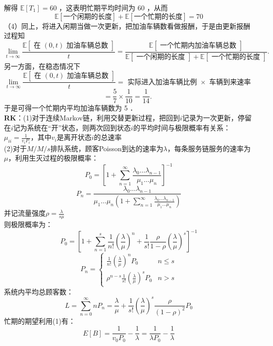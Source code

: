 \documentclass[UTF8]{ctexart}
\begin{document}
解得 $\mathbb{E} [T_1]=60$ ，这表明忙期平均时间为 60 ，从而
$$\mathbb{E}[ \text{一个闲期的长度} ]+\mathbb{E}[ \text{一个忙期的长度} ]=70$$
（4）同上，将进入闲期当做一次更新，把加油车辆数看做报酬，于是由更新报酬过程知\\
$$
\lim _{t \rightarrow \infty} \frac{\mathbb{E}[\text { 在 }(0, t) \text { 加油车辆总数 }]}{t}=\frac{\mathbb{E}[\text { 一个忙期内加油车辆总数 }]}{\mathbb{E}[\text { 一个闲期的长度 }]+\mathbb{E}[\text { 一个忙期的长度 }]} .
$$
另一方面，在稳态情况下\\
\[
\lim _{t \rightarrow \infty} \frac{\mathbb{E}[\text { 在 }(0, t) \text { 加油车辆总数 }]}{t}=\text { 实际进入加油车辆比例 } \times \text { 车辆到来速率 }
\]
\[
=\frac{5}{7} \times \frac{1}{10}=\frac{1}{14} \text {. }
\]
于是可得一个忙期内平均加油车辆数为 5 ．\\
\textbf{RK}：(1)对于连续Markov链，利用交替更新过程，把回到$i$记录为一次更新，停留在$i$记为系统在“开”状态，则两次回到状态$i$的平均时间与极限概率有关系：$\mu_{ii}=\frac{1}{v_i P_i}$，其中$v_i$是离开状态$i$的总速率\\
(2)对于$M/ M/ s$排队系统，顾客Poisson到达的速率为$\lambda$，每条服务链服务的速率为$\mu$，利用生灭过程的极限概率：\\
\[
P_0=\left[1+\sum\limits_{n=1}^{\infty} \frac{\lambda_0 \dots \lambda_{n-1}}{\mu_1 \dots \mu_n} \right] ^{-1}
\]
\[
P_n=\frac{\lambda_0 \dots \lambda_{n-1}}{\mu_1 \dots \mu_n\left(1+\sum\limits_{n=1}^{\infty} \frac{\lambda_0 \dots \lambda_{n-1}}{\mu_1 \dots \mu_n} \right) }
\]
并记流量强度$\rho=\frac{\lambda}{s\mu}$\\
则极限概率为：
\[
P_0=\left[1+\sum\limits_{n=1}^{s} \frac{1}{n!} \left( \frac{\lambda}{\mu}\right) ^n+\frac{1}{s!} \frac{\rho}{1-\rho} \left(\frac{\lambda}{\mu} \right) ^s \right] ^{-1}
\]
\[
P_n=
\begin{cases}
	\frac{1}{n!} \left(\frac{\lambda}{\mu} \right)^n P_0  &  n \le s \\
	\rho^{n-s} \frac{1}{s!} \left(\frac{\lambda}{\mu} \right)^s P_0  &  n>s
\end{cases}
\]
系统内平均总顾客数：
\[
L=\sum\limits_{n=0}^{\infty} nP_n=\frac{\lambda}{\mu}+\frac{1}{s!} \left(\frac{\lambda}{\mu} \right)^s \frac{\rho}{\left(1-\rho \right)^2 } P_0
\]
忙期的期望利用(1)有：
\[
E[B]=\frac{1}{v_0P_0}-\frac{1}{\lambda}=\frac{1}{\lambda P_0}-\frac{1}{\lambda}
\]\\
\end{document}
